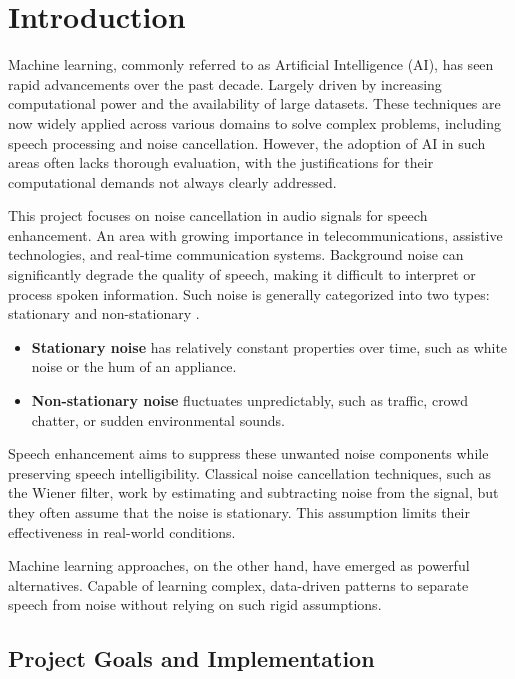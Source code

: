 \graphicspath{{content/chapters/1_introduction/figures}}
\chapter{Introduction}
\label{chp:introduction}

Machine learning, commonly referred to as Artificial Intelligence (AI), has seen rapid advancements over the past decade. Largely driven by increasing computational power and the availability of large datasets. These techniques are now widely applied across various domains to solve complex problems, including speech processing and noise cancellation. However, the adoption of AI in such areas often lacks thorough evaluation, with the justifications for their computational demands not always clearly addressed.

This project focuses on noise cancellation in audio signals for speech enhancement. An area with growing importance in telecommunications, assistive technologies, and real-time communication systems. Background noise can significantly degrade the quality of speech, making it difficult to interpret or process spoken information. Such noise is generally categorized into two types: stationary and non-stationary \cite{loizou2013speech}.

\begin{itemize}
    \item \textbf{Stationary noise} has relatively constant properties over time, such as white noise or the hum of an appliance.
    \item \textbf{Non-stationary noise} fluctuates unpredictably, such as traffic, crowd chatter, or sudden environmental sounds.
\end{itemize}

Speech enhancement aims to suppress these unwanted noise components while preserving speech intelligibility. Classical noise cancellation techniques, such as the Wiener filter, work by estimating and subtracting noise from the signal, but they often assume that the noise is stationary. This assumption limits their effectiveness in real-world conditions. 

Machine learning approaches, on the other hand, have emerged as powerful alternatives. Capable of learning complex, data-driven patterns to separate speech from noise without relying on such rigid assumptions.

\section{Project Goals and Implementation}

